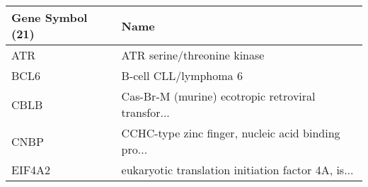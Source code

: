 \begin{tabular}{ll}
\toprule
Gene Symbol (21) &                                               Name \\
\midrule
             ATR &                        ATR serine/threonine kinase \\
            BCL6 &                              B-cell CLL/lymphoma 6 \\
            CBLB & Cas-Br-M (murine) ecotropic retroviral transfor... \\
            CNBP & CCHC-type zinc finger, nucleic acid binding pro... \\
          EIF4A2 & eukaryotic translation initiation factor 4A, is... \\
\bottomrule
\end{tabular}
